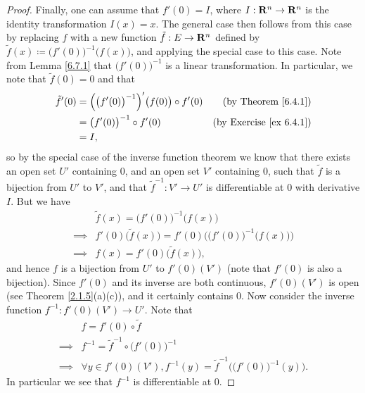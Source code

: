\begin{proof}
    Finally, one can assume that \(f'(0) = I\), where \(I : \mathbf{R}^n \to \mathbf{R}^n\) is the identity transformation \(I(x) = x\).
    The general case then follows from this case by replacing \(f\) with a new function \(\tilde{f} : E \to \mathbf{R}^n\) defined by \(\tilde{f}(x) \coloneqq \big(f'(0)\big)^{-1} \big(f(x)\big)\), and applying the special case to this case.
    Note from Lemma \ref{6.7.1} that \(\big(f'(0)\big)^{-1}\) is a linear transformation.
    In particular, we note that \(\tilde{f}(0) = 0\) and that
    \begin{align*}
        \tilde{f}'(0) & = \Big(\big(f'(0)\big)^{-1}\Big)'\big(f(0)\big) \circ f'(0) & \text{(by Theorem \ref{6.4.1})}     \\
                      & = \big(f'(0)\big)^{-1} \circ f'(0)                          & \text{(by Exercise \ref{ex 6.4.1})} \\
                      & = I,
    \end{align*}
    so by the special case of the inverse function theorem we know that there exists an open set \(U'\) containing \(0\), and an open set \(V'\) containing \(0\), such that \(\tilde{f}\) is a bijection from \(U'\) to \(V'\), and that \(\tilde{f}^{-1} : V' \to U'\) is differentiable at \(0\) with derivative \(I\).
    But we have
    \begin{align*}
                 & \tilde{f}(x) = \big(f'(0)\big)^{-1} \big(f(x)\big)                                 \\
        \implies & f'(0) \big(\tilde{f}(x)\big) = f'(0) \Big(\big(f'(0)\big)^{-1} \big(f(x)\big)\Big) \\
        \implies & f(x) = f'(0) \big(\tilde{f}(x)\big),
    \end{align*}
    and hence \(f\) is a bijection from \(U'\) to \(f'(0)(V')\)
    (note that \(f'(0)\) is also a bijection).
    Since \(f'(0)\) and its inverse are both continuous, \(f'(0)(V')\) is open (see Theorem \ref{2.1.5}(a)(c)), and it certainly contains \(0\).
    Now consider the inverse function \(f^{-1} : f'(0)(V') \to U'\).
    Note that
    \begin{align*}
                 & f = f'(0) \circ \tilde{f}                                                             \\
        \implies & f^{-1} = \tilde{f}^{-1} \circ \big(f'(0)\big)^{-1}                                    \\
        \implies & \forall y \in f'(0)(V'), f^{-1}(y) = \tilde{f}^{-1}\Big(\big(f'(0)\big)^{-1}(y)\Big).
    \end{align*}
    In particular we see that \(f^{-1}\) is differentiable at \(0\).


\end{proof}
